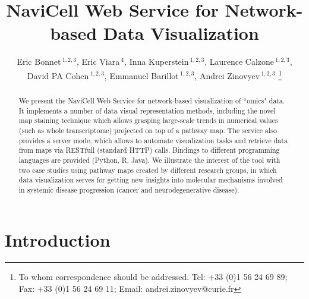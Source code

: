 \documentclass[a4,center,fleqn]{NAR}
\begin{document}
\title{NaviCell Web Service for Network-based Data Visualization}


\author{%
Eric Bonnet\,$^{1,2,3}$,
Eric Viara\,$^{4}$,
Inna Kuperstein\,$^{1,2,3}$,
Laurence Calzone\,$^{1,2,3}$,
David PA Cohen\,$^{1,2,3}$,
Emmanuel Barillot\,$^{1,2,3}$,
Andrei Zinovyev\,$^{1,2,3}$%
\footnote{To whom correspondence should be addressed.
Tel: +33 (0)1 56 24 69 89; Fax: +33 (0)1 56 24 69 11; Email: andrei.zinovyev@curie.fr}}

\address{%
$^{1}$Institut Curie, 26 rue d'Ulm, 75248 Paris, France,
$^{2}$INSERM U900, 75248 Paris, France,
$^{3}$Mines ParisTech, 77300 Fontainebleau, France,
$^{4}$Sysra, 91330 Yerres, France.
}




\maketitle

\begin{abstract}
We present the NaviCell Web Service for network-based visualization of
``omics" data.  It implements a number of data visual representation methods,
including the novel map staining technique which allows grasping large-scale
trends in numerical values (such as whole transcriptome) projected on top of a
pathway map. The service also provides a server mode, which allows to automate
visualization tasks and retrieve data from maps via RESTfull (standard HTTP)
calls.  Bindings to different programming languages are provided (Python,
R, Java).  We illustrate the interest of the tool with  two case studies using
pathway maps created by different research groups, in which data visualization
serves for getting new insights into molecular mechanisms involved in systemic
disease progression (cancer and neurodegenerative disease).  

\end{abstract}


\section{Introduction}
\end{document}
